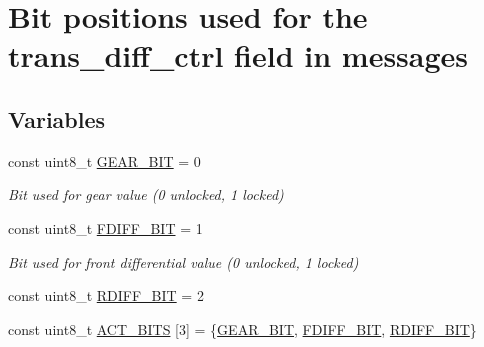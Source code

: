 \hypertarget{group__MsgBitPositions}{}\section{Bit positions used for the trans\+\_\+diff\+\_\+ctrl field in messages}
\label{group__MsgBitPositions}
\subsection*{Variables}
\begin{DoxyCompactItemize}
\item 
const uint8\+\_\+t \hyperlink{group__MsgBitPositions_ga34eaead62b770ea48065591164ec9e29}{G\+E\+A\+R\+\_\+\+B\+IT} = 0\hypertarget{group__MsgBitPositions_ga34eaead62b770ea48065591164ec9e29}{}\label{group__MsgBitPositions_ga34eaead62b770ea48065591164ec9e29}

\begin{DoxyCompactList}\small\item\em Bit used for gear value (0 unlocked, 1 locked) \end{DoxyCompactList}\item 
const uint8\+\_\+t \hyperlink{group__MsgBitPositions_ga9b82b2c57fd205efb6f330b75d48c8dc}{F\+D\+I\+F\+F\+\_\+\+B\+IT} = 1\hypertarget{group__MsgBitPositions_ga9b82b2c57fd205efb6f330b75d48c8dc}{}\label{group__MsgBitPositions_ga9b82b2c57fd205efb6f330b75d48c8dc}

\begin{DoxyCompactList}\small\item\em Bit used for front differential value (0 unlocked, 1 locked) \end{DoxyCompactList}\item 
const uint8\+\_\+t \hyperlink{group__MsgBitPositions_ga4f5aa3ea23a63189068319996dc40fc5}{R\+D\+I\+F\+F\+\_\+\+B\+IT} = 2
\item 
const uint8\+\_\+t \hyperlink{group__MsgBitPositions_ga72cf872102541424c2048e61e50c0709}{A\+C\+T\+\_\+\+B\+I\+TS} \mbox{[}3\mbox{]} = \{\hyperlink{group__MsgBitPositions_ga34eaead62b770ea48065591164ec9e29}{G\+E\+A\+R\+\_\+\+B\+IT}, \hyperlink{group__MsgBitPositions_ga9b82b2c57fd205efb6f330b75d48c8dc}{F\+D\+I\+F\+F\+\_\+\+B\+IT}, \hyperlink{group__MsgBitPositions_ga4f5aa3ea23a63189068319996dc40fc5}{R\+D\+I\+F\+F\+\_\+\+B\+IT}\}\hypertarget{group__MsgBitPositions_ga72cf872102541424c2048e61e50c0709}{}\label{group__MsgBitPositions_ga72cf872102541424c2048e61e50c0709}


\end{DoxyCompactItemize}
